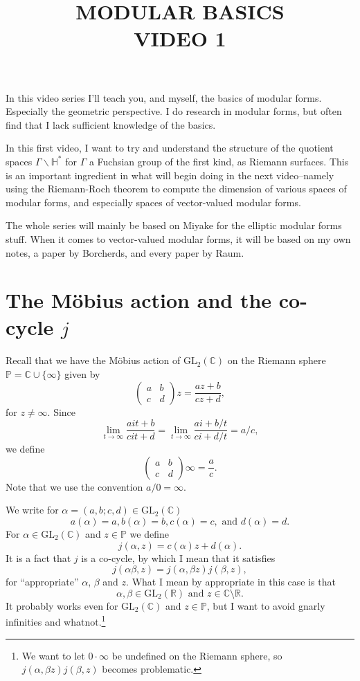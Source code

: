 \documentclass{article}
\title{{\bf MODULAR BASICS\\VIDEO 1}}
\theoremstyle{definition}
\begin{document}
\maketitle
In this video series I'll teach you, and myself, the basics of modular forms. Especially the geometric perspective. I do research in modular forms, but often find that I lack sufficient knowledge of the basics.

In this first video, I want to try and understand the structure of the quotient spaces $\Gamma\backslash\mathbb{H}^\ast$ for $\Gamma$ a Fuchsian group of the first kind, as Riemann surfaces. This is an important ingredient in what will begin doing in the next video--namely using the Riemann-Roch theorem to compute the dimension of various spaces of modular forms, and especially spaces of vector-valued modular forms.

The whole series will mainly be based on Miyake for the elliptic modular forms stuff. When it comes to vector-valued modular forms, it will be based on my own notes, a paper by Borcherds, and every paper by Raum.
\section{The Möbius action and the co-cycle $j$}
Recall that we have the Möbius action of $\mathrm{GL}_2(\mathbb{C})$ on the Riemann sphere $\mathbb{P}=\mathbb{C}\cup\{\infty\}$ given by
\[\begin{pmatrix}a&b\\c&d\end{pmatrix}\! z=\frac{az+b}{cz+d},\]
for $z\neq\infty$. Since
\[\lim_{t\to\infty}\frac{ait+b}{cit+d}=\lim_{t\to\infty}\frac{ai+b/t}{ci+d/t}=a/c,\]
we define
\[\begin{pmatrix}a&b\\c&d\end{pmatrix}\!\infty=\frac{a}{c}.\]
Note that we use the convention $a/0=\infty$.

We write for $\alpha=(a,b;c,d)\in\mathrm{GL}_2(\mathbb{C})$
\[a(\alpha)=a,b(\alpha)=b,c(\alpha)=c,\text{ and }d(\alpha)=d.\]
For $\alpha\in\mathrm{GL}_2(\mathbb{C})$ and $z\in\mathbb{P}$ we define
\[j(\alpha,z)=c(\alpha)z+d(\alpha).\]
It is a fact that $j$ is a co-cycle, by which I mean that it satisfies
\[j(\alpha\beta,z)=j(\alpha,\beta z)j(\beta,z),\]
for ``appropriate'' $\alpha$, $\beta$ and $z$. What I mean by appropriate in this case is that
\[\alpha,\beta\in\mathrm{GL}_2(\mathbb{R})\text{ and }z\in\mathbb{C}\setminus\mathbb{R}.\]
It probably works even for $\mathrm{GL}_2(\mathbb{C})$ and $z\in\mathbb{P}$, but I want to avoid gnarly infinities and whatnot.\footnote{We want to let $0\cdot\infty$ be undefined on the Riemann sphere, so $j(\alpha,\beta z)j(\beta,z)$ becomes problematic.}
\end{document}
